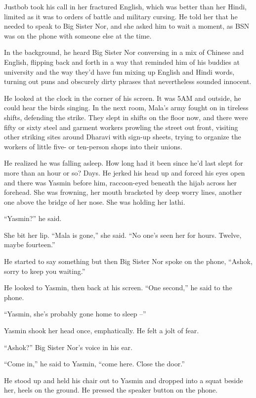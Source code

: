 Justbob took his call in her fractured English, which was better
than her Hindi, limited as it was to orders of battle and military
cursing. He told her that he needed to speak to Big Sister Nor, and
she asked him to wait a moment, as BSN was on the phone with
someone else at the time.

In the background, he heard Big Sister Nor conversing in a mix of
Chinese and English, flipping back and forth in a way that reminded
him of his buddies at university and the way they'd have fun mixing
up English and Hindi words, turning out puns and obscurely dirty
phrases that nevertheless sounded innocent.

He looked at the clock in the corner of his screen. It was 5AM and
outside, he could hear the birds singing. In the next room, Mala's
army fought on in tireless shifts, defending the strike. They slept
in shifts on the floor now, and there were fifty or sixty steel and
garment workers prowling the street out front, visiting other
striking sites around Dharavi with sign-up sheets, trying to
organize the workers of little five- or ten-person shops into their
unions.

He realized he was falling asleep. How long had it been since he'd
last slept for more than an hour or so? Days. He jerked his head up
and forced his eyes open and there was Yasmin before him,
raccoon-eyed beneath the hijab across her forehead. She was
frowning, her mouth bracketed by deep worry lines, another one
above the bridge of her nose. She was holding her lathi.

``Yasmin?'' he said.

She bit her lip. ``Mala is gone,'' she said. ``No one's seen her for
hours. Twelve, maybe fourteen.''

He started to say something but then Big Sister Nor spoke on the
phone, ``Ashok, sorry to keep you waiting.''

He looked to Yasmin, then back at his screen. ``One second,'' he said
to the phone.

``Yasmin, she's probably gone home to sleep --''

Yasmin shook her head once, emphatically. He felt a jolt of fear.

``Ashok?'' Big Sister Nor's voice in his ear.

``Come in,'' he said to Yasmin, ``come here. Close the door.''

He stood up and held his chair out to Yasmin and dropped into a
squat beside her, heels on the ground. He pressed the speaker
button on the phone.

